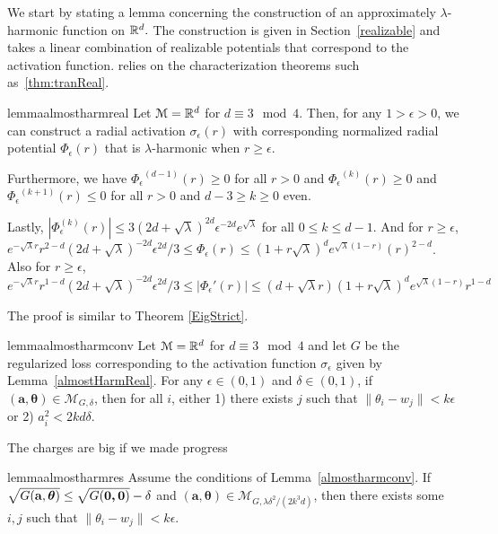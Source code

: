 %
We start by stating a lemma concerning the construction of an approximately
$\lambda$-harmonic function on ${\mathbb{R}}^d.$ The construction is given in
Section~\ref{realizable} and takes a linear combination of realizable potentials that correspond to the activation function. relies on the characterization theorems such as~\ref{thm:tranReal}. 
%
%
\begin{restatable}{lemma}{almostharmreal}\label{almostharmreal'}
Let $\mathcal{M} = {\mathbb{R}}^d$ for $d \equiv 3 \mod 4$. Then, for any $1 > \epsilon > 0$, we can construct a radial activation $\sigma_\epsilon(r)$ with corresponding normalized radial potential $\Phi_\epsilon(r)$ that is $\lambda$-harmonic when $r \geq \epsilon$.

Furthermore, we have ${\Phi_\epsilon}^{(d-1)}(r) \geq 0$ for all $r  > 0$ and ${\Phi_\epsilon}^{(k)}(r) \geq 0$ and ${\Phi_\epsilon}^{(k+1)}(r)\leq 0$ for all $r > 0$ and $d - 3 \geq k \geq 0 $ even.

Lastly, $|{\Phi}_\epsilon^{(k)}(r)| \leq 3(2d + \sqrt{\lambda})^{2d} \epsilon^{-2d}e^{\sqrt{\lambda}}$ for all $0 \leq k \leq d-1$. And for $r \geq \epsilon$, $e^{-\sqrt{\lambda}r}r^{2-d}(2d+\sqrt{\lambda})^{-2d}\epsilon^{2d}/3\leq {\Phi}_\epsilon(r) \leq (1+r\sqrt{\lambda})^de^{\sqrt{\lambda}(1-r)}(r)^{2-d}$. Also for $r \geq \epsilon$, $ e^{-\sqrt{\lambda}r}r^{1-d}(2d+\sqrt{\lambda})^{-2d}\epsilon^{2d}/3 \leq |{\Phi}_\epsilon'(r)| \leq (d+\sqrt{\lambda}r)(1+ r\sqrt{\lambda})^de^{\sqrt{\lambda}(1- r)} r^{1-d}$
\end{restatable}
%
%
The proof is similar to Theorem \ref{EigStrict}. 
%
\begin{restatable}{lemma}{almostharmconv}\label{almostharmconv}
Let $\mathcal{M} = {\mathbb{R}}^d$ for $d \equiv 3 \mod 4$ and let $G$ be the regularized loss corresponding to the activation function $\sigma_\epsilon$ given by Lemma~\ref{almostHarmReal}. For any $\epsilon \in (0,1)$ and $\delta \in (0, 1)$, if $\boldsymbol{(a,\theta)} \in \mathcal{M}_{G,\delta}$, then for all $i$, either 1) there exists $j$ such that $\|\theta_i - w_j\| < k\epsilon$ or 2) $a_i^2 < 2kd\delta$.
\end{restatable}
%
The charges are big if we made progress 
%
\begin{restatable}{lemma}{almostharmres}\label{almostHarmRes}
  Assume the conditions of Lemma~\ref{almostharmconv}. If
$\sqrt{G({\bf a, \boldsymbol{\theta}})} \leq \sqrt{G(\boldsymbol{0,0})} - \delta$
  and $(\boldsymbol{a,\theta}) \in \mathcal{M}_{G,\lambda \delta^2/(2k^3d)}$,
  then there exists some $i, j$ such that $\|\theta_i - w_j\| <k\epsilon$.
\end{restatable}
